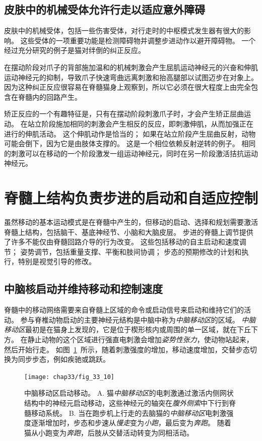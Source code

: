 \subsection{皮肤中的机械受体允许行走以适应意外障碍}

皮肤中的机械受体，包括一些伤害受体，对行走时的中枢模式发生器有很大的影响。
这些受体的一项重要功能是检测障碍物并调整步进动作以避开障碍物。
一个经过充分研究的例子是猫对绊倒的纠正反应。


在摆动阶段对爪子的背部施加温和的机械刺激会产生屈肌运动神经元的兴奋和伸肌运动神经元的抑制，导致爪子快速弯曲远离刺激和抬高腿部以试图迈步在对象上。
因为这种纠正反应很容易在脊髓猫身上观察到，所以它必须在很大程度上由完全包含在脊髓内的回路产生。


矫正反应的一个有趣特征是，只有在摆动阶段刺激爪子时，才会产生矫正屈曲运动。
在站立阶段施加相同的刺激会产生相反的反应，即刺激伸肌，从而加强正在进行的伸肌活动。
这个伸肌动作是恰当的；
如果在站立阶段产生屈曲反射，动物可能会倒下，因为它是由肢体支撑的。
这是一个相位依赖反射逆转的例子。
相同的刺激可以在移动的一个阶段激发一组运动神经元，同时在另一阶段激活拮抗运动神经元。



\section{脊髓上结构负责步进的启动和自适应控制}

虽然移动的基本运动模式是在脊髓中产生的，但移动的启动、选择和规划需要激活脊髓上结构，包括脑干、基底神经节、小脑和大脑皮层。
步进的脊髓上调节提供了许多不能仅由脊髓回路介导的行为改变。
这些包括移动的自主启动和速度调节；
姿势调节，包括重量支撑、平衡和肢间协调；
步态的预期修改的计划和执行，特别是视觉引导的修改。



\subsection{中脑核启动并维持移动和控制速度}

脊髓中的移动网络需要来自脊髓上区域的命令或启动信号来启动和维持它们的活动。
参与脊椎动物启动的主要神经元结构是中脑中称为\textit{中脑移动区}的区域。
\textit{中脑移动区}最初是在猫身上发现的，它是位于楔形核内或周围的单一区域，就在下丘下方。
在静止动物的这个区域进行强直电刺激会增加\textit{姿势性张力}，使动物站起来，然后开始行走。
如图~\ref{fig:33_10}~所示，随着刺激强度的增加，移动速度增加，交替步态切换为同步步态，例如疾驰或跳跃。


\begin{figure}[htbp]
	\centering
	\texttt{[image: chap33/fig\_33\_10]}
	\caption{中脑移动区启动移动。
		A. 猫\textit{中脑移动区}的电刺激通过激活内侧网状结构中的神经元启动移动，这些神经元的轴突在\textit{腹外侧索}中下行到脊髓移动系统。
		B. 当在跑步机上行走的去脑猫的\textit{中脑移动区}电刺激强度逐渐增加时，步态和步速从\textit{慢走}变为\textit{小跑}，最后变为\textit{奔跑}。
		随着猫从小跑变为\textit{奔跑}，后肢从交替活动转变为同相活动。}
	\label{fig:33_10}
\end{figure}


